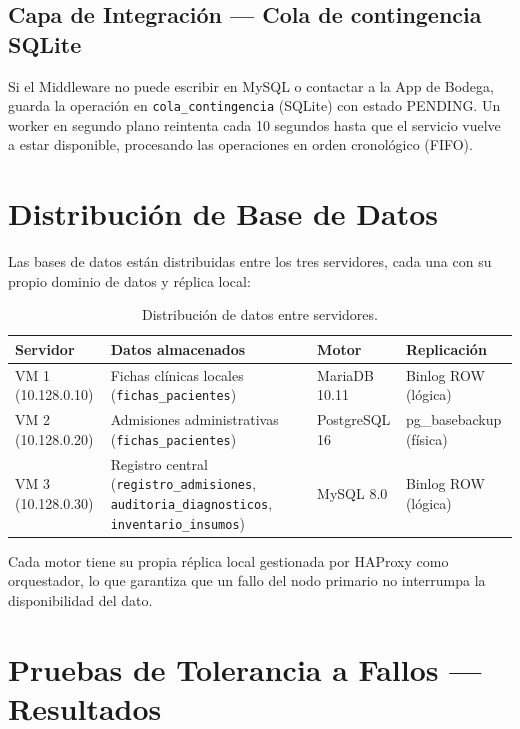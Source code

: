 \documentclass[11pt,a4paper]{article}
\begin{document}
\subsection{Capa de Integración — Cola de contingencia SQLite}

Si el Middleware no puede escribir en MySQL o contactar a la App de Bodega,
guarda la operación en \texttt{cola\_contingencia} (SQLite) con estado PENDING.
Un worker en segundo plano reintenta cada 10 segundos hasta que el servicio
vuelve a estar disponible, procesando las operaciones en orden cronológico (FIFO).

\section{Distribución de Base de Datos}

Las bases de datos están distribuidas entre los tres servidores, cada una con su
propio dominio de datos y réplica local:

\begin{table}[h!]
\centering
\begin{tabularx}{\textwidth}{lXll}
\toprule
\textbf{Servidor} & \textbf{Datos almacenados} & \textbf{Motor} & \textbf{Replicación} \\
\midrule
VM 1 (10.128.0.10) & Fichas clínicas locales (\texttt{fichas\_pacientes}) & MariaDB 10.11 & Binlog ROW (lógica) \\
VM 2 (10.128.0.20) & Admisiones administrativas (\texttt{fichas\_pacientes}) & PostgreSQL 16 & pg\_basebackup (física) \\
VM 3 (10.128.0.30) & Registro central (\texttt{registro\_admisiones}, \texttt{auditoria\_diagnosticos}, \texttt{inventario\_insumos}) & MySQL 8.0 & Binlog ROW (lógica) \\
\bottomrule
\end{tabularx}
\caption{Distribución de datos entre servidores.}
\end{table}

Cada motor tiene su propia réplica local gestionada por HAProxy como orquestador,
lo que garantiza que un fallo del nodo primario no interrumpa la disponibilidad del dato.

\section{Pruebas de Tolerancia a Fallos — Resultados}
\end{document}
